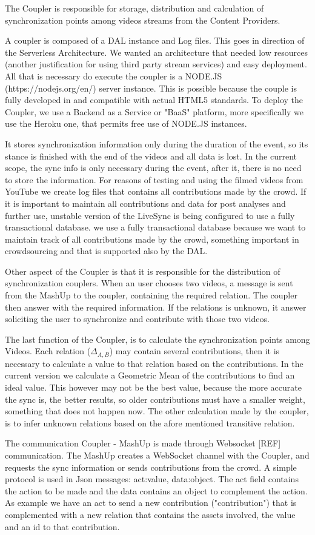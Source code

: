 The Coupler is responsible for storage, distribution and calculation of synchronization points among videos streams from the Content Providers.

A coupler is composed of a DAL instance and Log files. This goes in direction of the Serverless Architecture. We wanted an architecture that needed low resources (another justification for using third party stream services) and easy deployment. All that is necessary do execute the coupler is a NODE.JS (https://nodejs.org/en/) server instance. This is possible because the couple is fully developed in  and compatible with actual HTML5 standards. To deploy the Coupler, we use a Backend as a Service or "BaaS" platform, more specifically we use the Heroku one, that permits free use of NODE.JS instances.

It stores synchronization information only during the duration of the event, so its stance is finished with the end of the videos and all data is lost. In the current scope, the sync info is only necessary during the event, after it, there is no need to store the information. For reasons of testing and using the filmed videos from YouTube we create log files that contains all contributions made by the crowd. If it is important to maintain all contributions and data for post analyses and further use, unstable version of the LiveSync is being configured to use a fully transactional database. we use a fully transactional database because we want to maintain track of all contributions made by the crowd, something important in crowdsourcing and that is supported also by the DAL.

Other aspect of the Coupler is that it is responsible for the distribution of synchronization couplers. When an user chooses two videos, a message is sent from the MashUp to the coupler, containing the required relation. The coupler then answer with the required information. If the relations is unknown, it answer soliciting the user to synchronize and contribute with those two videos.

The last function of the Coupler, is to calculate the synchronization points among Videos. Each relation ($\Delta_{A,B}$) may contain several contributions, then it is necessary to calculate a value to that relation based on the contributions. In the current version we calculate a Geometric Mean of the contributions to find an ideal value. This however may not be the best value, because the more accurate the sync is, the better results, so older contributions must have a smaller weight, something that does not happen now. The other calculation made by the coupler, is to infer unknown relations based on the afore mentioned transitive relation.

The communication Coupler - MashUp is made through Websocket [REF] communication. The MashUp creates a WebSocket channel with the Coupler, and requests the sync information or sends contributions from the crowd. A simple protocol is used in Json messages: {act:value, data:object}. The act field contains the action to be made and the data contains an object to complement the action. As example we have an act to send a new contribution ("contribution") that is complemented with a new relation that contains the assets involved, the value and an id to that contribution.